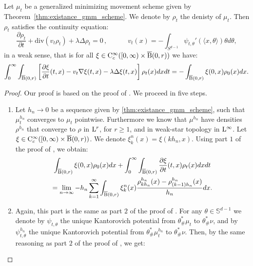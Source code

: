 \begin{thm}
Let $\mu_t$ be a generalized minimizing movement scheme given by Theorem~\ref{thm:existance_gmm_scheme}. We denote by $\rho_t$ the denisty of $\mu_t$. Then $\rho_t$ satisfies the continuity equation:
\[
\frac{\partial \rho_t}{\partial t} + \text{div}(v_t \rho_t) + \lambda \Delta \rho_t = 0 \,, \quad \quad \quad v_t(x) = - \int_{S^{d-1}} \psi_{t, \theta}'(\langle x , \theta \rangle ) \theta d\theta ,
\]
in a weak sense, that is for all $\xi \in \mathrm{C}_c^{\infty} ([0, \infty)\times \operatorname{\overline{B}}(0,r))$ we have:
\[
\int_0^{\infty} \int_{\operatorname{\overline{B}}(0,r)} \left[\frac{\partial \xi}{\partial t}(t,x) - v_t \nabla \xi(t,x)  - \lambda \Delta \xi(t,x)\right] \rho_t(x) dx dt = -\int_{\operatorname{\overline{B}}(0,r)} \xi(0,x)\rho_0(x) dx.
\]
\end{thm}
\begin{proof}
Our proof is based on the proof of \cite[Theorem 5.6.1]{bonnotte2013unidimensional}. We proceed in five steps.

\begin{enumerate}[wide, labelwidth=!, labelindent=0pt,label=(\arabic*)]
\item Let $h_n \rightarrow 0$ be a sequence given by \ref{thm:existance_gmm_scheme}, such that $\mu_t^{h_n}$ converges to $\mu_t$ pointwise. Furthermore we know that $\mu^{h_n}$ have densities $\rho^{h_n}$ that converge to $\rho$ in $\mathrm{L}^r$, for $r \geq 1$, and in weak-star topology in $\mathrm{L}^{\infty}$. Let $\xi \in \mathrm{C}_c^{\infty} ([0, \infty) \times \operatorname{\overline{B}}(0,r))$. We denote $\xi_{k}^n(x)  = \xi(kh_n, x)$. Using part $1$ of the proof of  \cite[Theorem 5.6.1]{bonnotte2013unidimensional}, we obtain:
\begin{multline} \label{thm:cont_proof_part1}
\int_{\operatorname{\overline{B}}(0,r)} \xi(0, x) \rho_0(x) dx + \int_0^{\infty} \int_{\operatorname{\overline{B}}(0,r)} \frac{\partial \xi}{\partial t}(t,x) \rho_t(x) dx dt \\
= \lim_{n \rightarrow \infty} - h_n \sum_{k=1}^{\infty} \int_{\operatorname{\overline{B}}(0,r)} \xi_k^n(x) \frac{\rho_{kh_n}^{h_n}(x) - \rho_{(k-1)h_n}^{h_n}(x) }{h_n} dx.
\end{multline}
\item Again, this part is the same as part $2$ of the proof of  \cite[Theorem 5.6.1]{bonnotte2013unidimensional}. For any $\theta \in \mathbb{S}^{d-1}$ we denote by $\psi_{t, \theta}$ the unique Kantorovich potential from $\theta_{\#}^{*}\mu_t$ to $\theta_{\#}^{*}\nu$, and by $\psi_{t, \theta}^{h_n}$ the unique Kantorovich potential from $\theta_{\#}^{*} \mu_t^{h_n}$ to $\theta_{\#}^{*} \nu$. Then, by the same reasoning as part $2$ of the proof of  \cite[Theorem 5.6.1]{bonnotte2013unidimensional}, we get:


\end{enumerate}
\end{proof}
